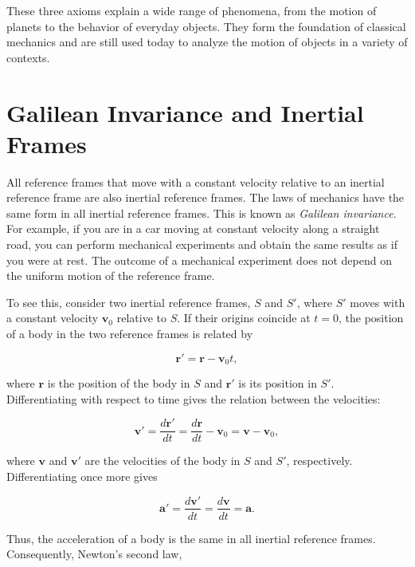 \documentclass[12pt]{article}
\begin{document}
These three axioms explain a wide range of phenomena, from the motion of planets to the behavior of everyday objects. They form the foundation of classical mechanics and are still used today to analyze the motion of objects in a variety of contexts.

\section{Galilean Invariance and Inertial Frames}

All reference frames that move with a constant velocity relative to an inertial reference frame are also inertial reference frames. The laws of  mechanics have the same form in all inertial reference frames. This is known as \emph{Galilean invariance}. For example, if you are in a car moving at constant velocity along a straight road, you can perform mechanical experiments and obtain the same results as if you were at rest. The outcome of a mechanical experiment does not depend on the uniform motion of the reference frame.

To see this, consider two inertial reference frames, $S$ and $S'$, where $S'$ moves with a constant velocity $\mathbf{v}_0$ relative to $S$. If their origins coincide at $t=0$, the position of a body in the two reference frames is related by

\begin{equation}
\mathbf{r}' = \mathbf{r} - \mathbf{v}_0 t,
\end{equation}

where $\mathbf{r}$ is the position of the body in $S$ and $\mathbf{r}'$ is its position in $S'$. Differentiating with respect to time gives the relation between the velocities:

\begin{equation}
\mathbf{v}' = \frac{d\mathbf{r}'}{dt}
= \frac{d\mathbf{r}}{dt} - \mathbf{v}_0
= \mathbf{v} - \mathbf{v}_0,
\end{equation}

where $\mathbf{v}$ and $\mathbf{v}'$ are the velocities of the body in $S$ and $S'$, respectively. Differentiating once more gives

\begin{equation}
\mathbf{a}' = \frac{d\mathbf{v}'}{dt}
= \frac{d\mathbf{v}}{dt}
= \mathbf{a}.
\end{equation}

Thus, the acceleration of a body is the same in all inertial reference frames. Consequently, Newton's second law,
\end{document}
